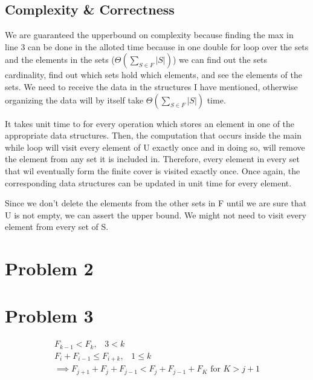 \documentclass[10pt]{article}
\begin{document}
\subsection*{Complexity \& Correctness}
We are guaranteed the upperbound on complexity because finding the  max in line 3 can be done in the alloted time because in one double for loop over the sets and the elements in the sets ($\Theta(\sum\limits_{S\in F}|S|)$) we can find out the sets cardinality, find out which sets hold which elements, and see the elements of the sets. We need to receive the data in the structures I have mentioned, otherwise organizing the data will by itself take $\Theta(\sum\limits_{S\in F}|S|)$ time.

It takes unit time to for every operation which stores an element in one of the appropriate data structures. Then, the computation that occurs inside the main while loop will visit every element of U exactly once and in doing so, will remove the element from any set it is included in. Therefore, every element in every set that wil eventually form the finite cover is visited exactly once. Once again, the corresponding data structures can be updated in unit time for every element. 

Since we don't delete the elements from the other sets in F until we are sure that U is not empty, we can assert the upper bound. We might not need to visit every element from every set of S. 

\section*{Problem 2}

\section*{Problem 3}
\begin{gather}
F_{k - 1} < F_{k}, \;\;\; 3 < k\\
F_{i} + F_{i-1} \le F_{i+k},\;\;\; 1 \le k\\
\implies  F_{j+1} + F_{j} + F_{j-1} < F_{j}+F_{j-1} + F_K \textrm{ for } K > j+1
\end{gather}
\end{document}
